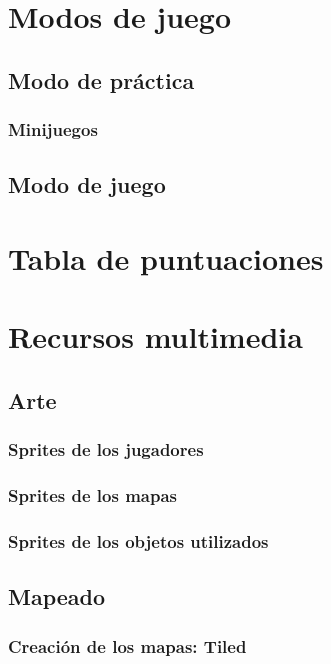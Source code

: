 \documentclass[12pt, spanish]{article}
\begin{document}
\section{Modos de juego}

\subsection{Modo de práctica}

\subsubsection{Minijuegos}

\subsection{Modo de juego}

\section{Tabla de puntuaciones}



\section{Recursos multimedia}

\subsection{Arte}

\subsubsection{Sprites de los jugadores}

\subsubsection{Sprites de los mapas}

\subsubsection{Sprites de los objetos utilizados}


\subsection{Mapeado}

\subsubsection{Creación de los mapas: Tiled}
\end{document}

